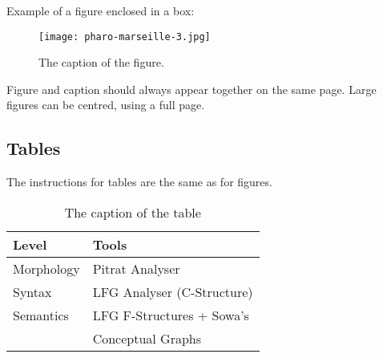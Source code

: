 \documentclass[10pt, a4paper]{article}
\begin{document}
Example of a figure enclosed in a box:

\begin{figure}[!h]
\begin{center}
\texttt{[image: pharo-marseille-3.jpg]} 

\caption{The caption of the figure.}
\label{fig.1}
\end{center}
\end{figure}

Figure and caption should always appear together on the same page. Large figures can be centred, using a full page.

\subsection{Tables}

The instructions for tables are the same as for figures.
%
\begin{table}[!h]
\begin{center}
\begin{tabularx}{\columnwidth}{|l|X|}

      \hline
      Level&Tools\\
      \hline
      Morphology & Pitrat Analyser\\
      \hline
      Syntax & LFG Analyser (C-Structure)\\
      \hline
     Semantics & LFG F-Structures + Sowa's\\
     & Conceptual Graphs\\
      \hline

\end{tabularx}
\caption{The caption of the table}
 \end{center}
\end{table}
\end{document}
